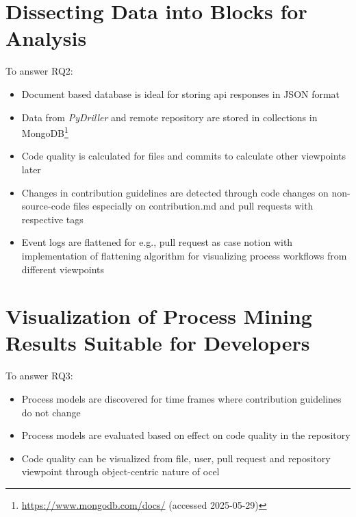 \section{Dissecting Data into Blocks for Analysis}
To answer RQ2:
\begin{itemize}
	\item Document based database is ideal for storing \ac{api} responses in JSON format
	\item Data from \emph{PyDriller} and remote repository are stored in  collections in MongoDB\footnote{\url{https://www.mongodb.com/docs/} (accessed 2025-05-29)}
	\item Code quality is calculated for files and commits to calculate other viewpoints later
	\item Changes in contribution guidelines are detected through code changes on non-source-code files especially on contribution.md and pull requests with respective tags
	\item Event logs are flattened for e.g., pull request as case notion with implementation of flattening algorithm for visualizing process workflows from different viewpoints
\end{itemize}

\section{Visualization of Process Mining Results Suitable for Developers}
To answer RQ3:
\begin{itemize}
	\item Process models are discovered for time frames where contribution guidelines do not change
	\item Process models are evaluated based on effect on code quality in the repository
	\item Code quality can be visualized from file, user, pull request and repository viewpoint through object-centric nature of \ac{ocel}
\end{itemize}